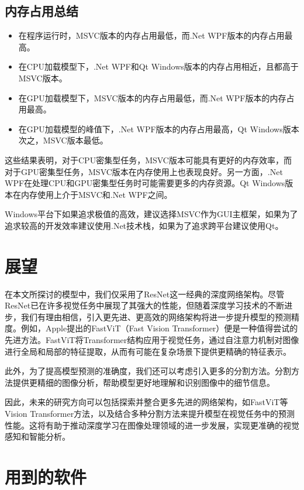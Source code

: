 \subsection{内存占用总结}

\begin{itemize}
	\item 在程序运行时，MSVC版本的内存占用最低，而.Net WPF版本的内存占用最高。
	\item 在CPU加载模型下，.Net WPF和Qt Windows版本的内存占用相近，且都高于MSVC版本。
	\item 在GPU加载模型下，MSVC版本的内存占用最低，而.Net WPF版本的内存占用最高。
	\item 在GPU加载模型的峰值下，.Net WPF版本的内存占用最高，Qt Windows版本次之，MSVC版本最低。
\end{itemize}

这些结果表明，对于CPU密集型任务，MSVC版本可能具有更好的内存效率，而对于GPU密集型任务，MSVC版本在内存使用上也表现良好。另一方面，.Net WPF在处理CPU和GPU密集型任务时可能需要更多的内存资源。Qt Windows版本在内存使用上介于MSVC和.Net WPF之间。

Windows平台下如果追求极值的高效，建议选择MSVC作为GUI主框架，如果为了追求较高的开发效率建议使用.Net技术栈，如果为了追求跨平台建议使用Qt。

\section{展望}

在本文所探讨的模型中，我们仅采用了ResNet这一经典的深度网络架构。尽管ResNet已在许多视觉任务中展现了其强大的性能，但随着深度学习技术的不断进步，我们有理由相信，引入更先进、更高效的网络架构将进一步提升模型的预测精度。例如，Apple提出的FastViT（Fast Vision Transformer）便是一种值得尝试的先进方法。FastViT将Transformer结构应用于视觉任务，通过自注意力机制对图像进行全局和局部的特征提取，从而有可能在复杂场景下提供更精确的特征表示。

此外，为了提高模型预测的准确度，我们还可以考虑引入更多的分割方法。分割方法提供更精细的图像分析，帮助模型更好地理解和识别图像中的细节信息。

因此，未来的研究方向可以包括探索并整合更多先进的网络架构，如FastViT等Vision Transformer方法，以及结合多种分割方法来提升模型在视觉任务中的预测性能。这将有助于推动深度学习在图像处理领域的进一步发展，实现更准确的视觉感知和智能分析。

\section{用到的软件}


